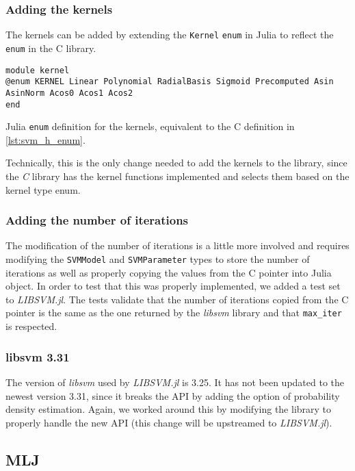 \subsubsection{Adding the kernels}

The kernels can be added by extending the \texttt{Kernel} \texttt{enum} in Julia to reflect the
\texttt{enum} in the C library.
\begin{listing}[H]
\begin{verbatim}
module kernel
@enum KERNEL Linear Polynomial RadialBasis Sigmoid Precomputed Asin AsinNorm Acos0 Acos1 Acos2
end
\end{verbatim}
\caption{Julia \texttt{enum} definition for the kernels, equivalent to the C definition in \cref{lst:svm_h_enum}.}
\label{lst:kernel_enum_julia}
\end{listing}

Technically, this is the only change needed to add the kernels to the library, since the
\emph{C} library has the kernel functions implemented and selects them based on the kernel type enum.

\subsubsection{Adding the number of iterations}

The modification of the number of iterations is a little more involved and requires modifying the
\texttt{SVMModel} and \texttt{SVMParameter} types to store the number of iterations as well
as properly copying the values from the C pointer into Julia object. In order to test that
this was properly implemented, we added a test set to \emph{LIBSVM.jl}. The tests
validate that the number of iterations copied from the C pointer is the same as the one
returned by the \emph{libsvm} library and that \texttt{max\_iter} is respected.

\subsubsection{libsvm 3.31}

The version of \emph{libsvm} used by \emph{LIBSVM.jl} is 3.25. It has not been updated to the
newest version 3.31, since it breaks the API by adding the option of
probability density estimation. Again, we worked around this by modifying the library to properly
handle the new API (this change will be upstreamed to \emph{LIBSVM.jl}). %

\subsection{MLJ}

